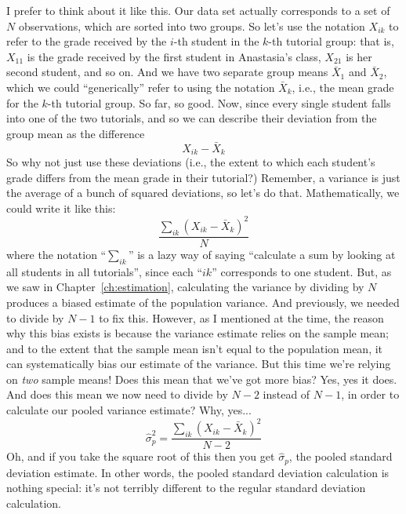 
I prefer to think about it like this. Our data set actually corresponds to a set of $N$ observations, which are sorted into two groups. So let's use the notation $X_{ik}$ to refer to the grade received by the $i$-th student in the $k$-th tutorial group: that is, $X_{11}$ is the grade received by the first student in Anastasia's class, $X_{21}$ is her second student, and so on. And we have two separate group means $\bar{X}_1$ and $\bar{X}_2$, which we could ``generically'' refer to using the notation $\bar{X}_k$, i.e., the mean grade for the $k$-th tutorial group. So far, so good. Now, since every single student falls into one of the two tutorials, and so we can describe their deviation from the group mean as the difference
$$
X_{ik} - \bar{X}_k
$$
So why not just use these deviations (i.e., the extent to which each student's grade differs from the mean grade in their tutorial?) Remember, a variance is just the average of a bunch of squared deviations, so let's do that. Mathematically, we could write it like this:
$$
\frac{\sum_{ik} \left( X_{ik} - \bar{X}_k \right)^2}{N}
$$
where the notation ``$\sum_{ik}$'' is a lazy way of saying ``calculate a sum by looking at all students in all tutorials'', since each ``$ik$'' corresponds to one student. But, as we saw in Chapter~\ref{ch:estimation}, calculating the variance by dividing by $N$ produces a biased estimate of the population variance. And previously, we needed to divide by $N-1$ to fix this. However, as I mentioned at the time, the reason why this bias exists is because the variance estimate relies on the sample mean; and to the extent that the sample mean isn't equal to the population mean, it can systematically bias our estimate of the variance. But this time we're relying on {\it two} sample means! Does this mean that we've got more bias? Yes, yes it does. And does this mean we now need to divide by $N-2$ instead of $N-1$, in order to calculate our pooled variance estimate? Why, yes...
$$
\hat\sigma^2_p = \frac{\sum_{ik} \left( X_{ik} - \bar{X}_k \right)^2}{N -2}
$$
Oh, and if you take the square root of this then you get $\hat{\sigma}_p$, the pooled standard deviation estimate. In other words, the pooled standard deviation calculation is nothing special: it's not terribly different to the regular standard deviation calculation. 



